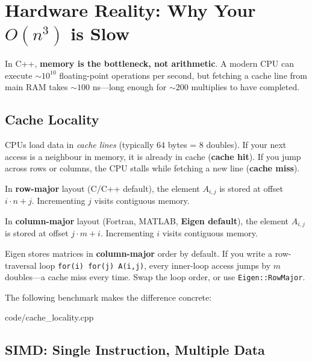 \section{Hardware Reality: Why Your \texorpdfstring{$O(n^3)$}{O(n³)} is Slow}
\label{sec:hardware}

In C++, \textbf{memory is the bottleneck, not arithmetic}.
A modern CPU can execute $\sim\!10^{10}$ floating-point operations per second,
but fetching a cache line from main RAM takes $\sim\!100$ ns---long enough
for $\sim\!200$ multiplies to have completed.

\subsection{Cache Locality}

CPUs load data in \emph{cache lines} (typically 64 bytes = 8 doubles).
If your next access is a neighbour in memory, it is already in cache
(\textbf{cache hit}).  If you jump across rows or columns, the CPU stalls
while fetching a new line (\textbf{cache miss}).

\begin{definition}
In \textbf{row-major} layout (C/C++ default), the element
$A_{i,j}$ is stored at offset $i \cdot n + j$.
Incrementing $j$ visits contiguous memory.

In \textbf{column-major} layout (Fortran, MATLAB, \textbf{Eigen default}),
the element $A_{i,j}$ is stored at offset $j \cdot m + i$.
Incrementing $i$ visits contiguous memory.
\end{definition}

\begin{warningbox}
Eigen stores matrices in \textbf{column-major} order by default.
If you write a row-traversal loop \texttt{for(i) for(j) A(i,j)},
every inner-loop access jumps by $m$ doubles---a cache miss every time.
Swap the loop order, or use \texttt{Eigen::RowMajor}.
\end{warningbox}

The following benchmark makes the difference concrete:


                {code/cache_locality.cpp}

\subsection{SIMD: Single Instruction, Multiple Data}

